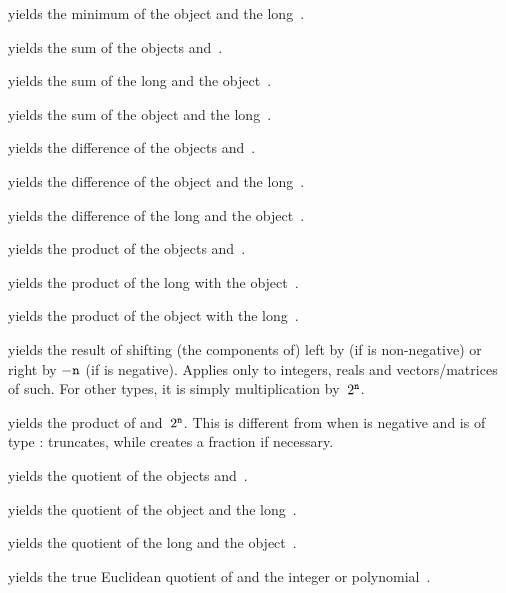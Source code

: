  yields the minimum of the object
 and the long~.

 yields the sum of the objects 
and~.

 yields the sum of the long 
and the object~.

 yields the sum of the object
 and the long~.

 yields the difference of the objects
 and~.

 yields the difference of the
object  and the long~.

 yields the difference of the
long  and the object~.

 yields the product of the objects
 and~.

 yields the product of the long
 with the object~.

 yields the product of the object
 with the long~.

 yields the result of shifting
(the components of)  left by  (if  is non-negative)
or right by $-{\tt n}$ (if  is negative).
Applies only to integers, reals and vectors/matrices of such. For other
types, it is simply multiplication by~$2^{{\tt n}}$.

 yields the product of 
and~$2^{{\tt n}}$. This is different from  when  is negative
and  is of type :  truncates, while 
creates a fraction if necessary.

 yields the quotient of the objects
 and~.

 yields the quotient of the object
 and the long~.

 yields the quotient of the long
 and the object~.

 yields the true Euclidean
quotient of  and the integer or polynomial~.

